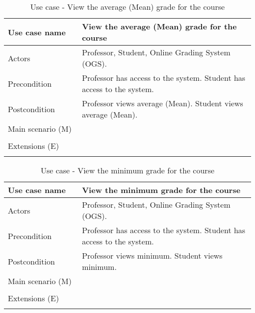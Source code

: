 \documentclass[12pt]{article}
\newcommand\tabularhead[1]{
\begin{table}[h]
  \caption{Use case - #1}
  \begin{tabular}{|p{0.3\linewidth}|p{0.7\linewidth}|}
    \hline
    \textbf{Use case name} & \textbf{#1} \\
    \hline}
\newcommand\addrow[2]{#1 &#2\\ \hline}
\newcommand\adddoublerow[2]{\begin{minipage}[t][][t]{2.5cm}#1\end{minipage}%
    &\begin{minipage}[t][][t]{\linewidth}
     \begin{itemize}\setlength{\itemsep}{0pt}%
        #2     
     \end{itemize}
     \end{minipage}\\ \hline}
\newcommand\addmulrow[2]{ \begin{minipage}[t][][t]{2.5cm}#1\end{minipage}%
     &\begin{minipage}[t][][t]{\linewidth}
      \begin{enumerate}\setlength{\itemsep}{0pt}%
        #2   
      \end{enumerate}
      \end{minipage}\\ \hline}
\newenvironment{usecase}{\tabularhead}
{\hline\end{tabular}\end{table}}
\begin{document}
\begin{usecase}{View the average (Mean) grade for the course}
    \addrow{Actors}{Professor, Student, Online Grading System (OGS).}
    \addrow{Precondition}{Professor has access to the system. Student has access to the system.}
    \addrow{Postcondition}{Professor views average (Mean). Student views average (Mean).}
    \addmulrow{Main scenario (M)}{
        \item Professor or Student logins to the system.
        \item The system shows the list of available courses for the user (Professor or Student).
        \item Professor or Student chooses the desirable course.
        \item The system shows the average (Mean) grade for the course.\\
    }
    \adddoublerow{Extensions (E)}{
        \item[] 1.1. Professor or Student entered the wrong credentials
        \item[] 1.2. Go to 1\\
    }
\end{usecase}
\newpage
\begin{usecase}{View the minimum grade for the course}
    \addrow{Actors}{Professor, Student, Online Grading System (OGS).}
    \addrow{Precondition}{Professor has access to the system. Student has access to the system.}
    \addrow{Postcondition}{Professor views minimum.  Student views minimum.}
    \addmulrow{Main scenario (M)}{
        \item Professor or Student logins to the system.
        \item The system shows the list of available courses for the user (Professor or Student).
        \item Professor or Student chooses the desirable course.
        \item The system shows the minimum grade for the course.\\
    }
    \adddoublerow{Extensions (E)}{
        \item[] 1.1. Professor or Student entered the wrong credentials
        \item[] 1.2. Go to 1\\
    }
\end{usecase}
\end{document}
